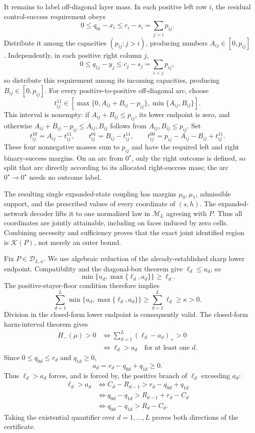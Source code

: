 It remains to label off-diagonal layer mass.  In each positive left row \(i\), the residual control-success requirement obeys
\[
 0\le q_{0i}-x_i\le r_i-s_i=\sum_{j>i}p_{ij}.
\]
Distribute it among the capacities \((p_{ij}:j>i)\), producing numbers \(A_{ij}\in[0,p_{ij}]\).  Independently, in each positive right column \(j\),
\[
 0\le q_{1j}-y_j\le c_j-s_j=\sum_{i<j}p_{ij},
\]
so distribute this requirement among its incoming capacities, producing \(B_{ij}\in[0,p_{ij}]\).  For every positive-to-positive off-diagonal arc, choose
\[
 t_{ij}^{11}\in
 \left[
 \max\{0,A_{ij}+B_{ij}-p_{ij}\},
 \min\{A_{ij},B_{ij}\}
 \right].
\]
This interval is nonempty: if \(A_{ij}+B_{ij}\le p_{ij}\), its lower endpoint is zero, and otherwise
\(A_{ij}+B_{ij}-p_{ij}\le A_{ij},B_{ij}\) follows from \(A_{ij},B_{ij}\le p_{ij}\).  Set
\[
 t_{ij}^{10}=A_{ij}-t_{ij}^{11},\qquad
 t_{ij}^{01}=B_{ij}-t_{ij}^{11},\qquad
 t_{ij}^{00}=p_{ij}-A_{ij}-B_{ij}+t_{ij}^{11}.
\]
These four nonnegative masses sum to \(p_{ij}\) and have the required left and right binary-success margins.  On an arc from \(0^{\star}\), only the right outcome is defined, so split that arc directly according to its allocated right-success mass; the arc \(0^{\star}\to0^{\star}\) needs no outcome label.

The resulting single expanded-state coupling has margins \(\mu_0,\mu_1\), admissible support, and the prescribed values of every coordinate of \((s,h)\).  The expanded-network decoder lifts it to one normalized law in \(\mathcal M_L\) agreeing with \(P\).  Thus all coordinates are jointly attainable, including on faces induced by zero cells.  Combining necessity and sufficiency proves that the exact joint identified region is \(\mathcal K(P)\), not merely an outer bound.

Fix \(P\in\mathcal D_{L,\kappa}\).  We use algebraic reduction of the already-established sharp lower endpoint.  Compatibility and the diagonal-box theorem give \(\ell_d\le u_d\), so
\[
 \min\{u_d,\max\{\ell_d,a_d\}\}\ge\ell_d.
\]
The positive-stayer-floor condition therefore implies
\[
 \sum_{d=1}^{L}\min\{u_d,\max\{\ell_d,a_d\}\}
 \ge\sum_{d=1}^{L}\ell_d
 \ge\kappa>0.
\]
Division in the closed-form lower endpoint is consequently valid.  The closed-form harm-interval theorem gives
\[
 \begin{aligned}
 H_-(\mu)>0
 &\Longleftrightarrow
 \sum_{d=1}^{L}(\ell_d-a_d)_+>0\\
 &\Longleftrightarrow
 \ell_d>a_d\quad\text{for at least one }d.
 \end{aligned}
\]
Since \(0\le q_{0d}\le r_d\) and \(q_{1d}\ge0\),
\[
 a_d=r_d-q_{0d}+q_{1d}\ge0.
\]
Thus \(\ell_d>a_d\) forces, and is forced by, the positive branch of \(\ell_d\) exceeding \(a_d\):
\[
 \begin{aligned}
 \ell_d>a_d
 &\Longleftrightarrow C_d-R_{d-1}>r_d-q_{0d}+q_{1d}\\
 &\Longleftrightarrow q_{0d}-q_{1d}>R_{d-1}+r_d-C_d\\
 &\Longleftrightarrow q_{0d}-q_{1d}>R_d-C_d.
 \end{aligned}
\]
Taking the existential quantifier over \(d=1,\ldots,L\) proves both directions of the certificate.

